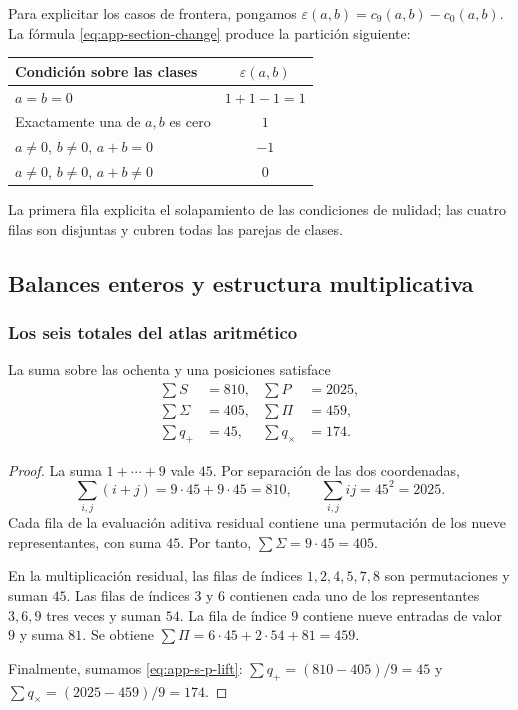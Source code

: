 Para explicitar los casos de frontera, pongamos $\varepsilon(a,b)=c_9(a,b)-c_0(a,b)$. La fórmula \eqref{eq:app-section-change} produce la partición siguiente:
\begin{tablacompleta}[H]
\caption{Corrección del acarreo bajo cambio de sección.}
\label{tab:app-casos-seccion}
\begin{tabular}{lc}
\toprule
Condición sobre las clases & $\varepsilon(a,b)$\\
\midrule
$a=b=0$ & $1+1-1=1$\\
Exactamente una de $a,b$ es cero & $1$\\
$a\neq0$, $b\neq0$, $a+b=0$ & $-1$\\
$a\neq0$, $b\neq0$, $a+b\neq0$ & $0$\\
\bottomrule
\end{tabular}
\end{tablacompleta}
La primera fila explicita el solapamiento de las condiciones de nulidad; las cuatro filas son disjuntas y cubren todas las parejas de clases.

\subsection{Balances enteros y estructura multiplicativa}
\label{sec:app-balances}

\subsubsection{Los seis totales del atlas aritmético}

\begin{bloqueindivisible}
\begin{proposicion}
\label{prop:app-totales}
La suma sobre las ochenta y una posiciones satisface
\begin{align}
 \sum S&=810, &\sum P&=2025,\\
 \sum\Sigma&=405, &\sum\Pi&=459,\\
 \sum q_+&=45, &\sum q_\times&=174.
 \label{eq:app-six-totals}
\end{align}
\end{proposicion}

\begin{proof}
La suma $1+\cdots+9$ vale $45$. Por separación de las dos coordenadas,
\[
 \sum_{i,j}(i+j)=9\cdot45+9\cdot45=810,
 \qquad \sum_{i,j}ij=45^2=2025.
\]
Cada fila de la evaluación aditiva residual contiene una permutación de los nueve representantes, con suma $45$. Por tanto, $\sum\Sigma=9\cdot45=405$.

En la multiplicación residual, las filas de índices $1,2,4,5,7,8$ son permutaciones y suman $45$. Las filas de índices $3$ y $6$ contienen cada uno de los representantes $3,6,9$ tres veces y suman $54$. La fila de índice $9$ contiene nueve entradas de valor $9$ y suma $81$. Se obtiene $\sum\Pi=6\cdot45+2\cdot54+81=459$.

Finalmente, sumamos \eqref{eq:app-s-p-lift}: $\sum q_+=(810-405)/9=45$ y $\sum q_\times=(2025-459)/9=174$.
\end{proof}
\end{bloqueindivisible}

